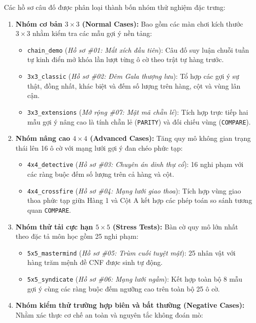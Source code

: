 Các hồ sơ câu đố được phân loại thành bốn nhóm thử nghiệm đặc trưng:
\begin{enumerate}
    \item \textbf{Nhóm cơ bản $3 \times 3$ (Normal Cases):} Bao gồm các màn chơi kích thước $3 \times 3$ nhằm kiểm tra các mẫu gợi ý nền tảng:
    \begin{itemize}
        \item \texttt{chain\_demo} (\textit{Hồ sơ \#01: Mắt xích đầu tiên}): Câu đố suy luận chuỗi tuần tự kinh điển mở khóa lần lượt từng ô cờ theo trật tự hàng trước.
        \item \texttt{3x3\_classic} (\textit{Hồ sơ \#02: Đêm Gala thượng lưu}): Tổ hợp các gợi ý sự thật, đồng nhất, khác biệt và đếm số lượng trên hàng, cột và vùng lân cận.
        \item \texttt{3x3\_extensions} (\textit{Mở rộng \#07: Mật mã chẵn lẻ}): Tích hợp trực tiếp hai mẫu gợi ý nâng cao là tính chẵn lẻ (\texttt{PARITY}) và đối chiếu vùng (\texttt{COMPARE}).
    \end{itemize}
    \item \textbf{Nhóm nâng cao $4 \times 4$ (Advanced Cases):} Tăng quy mô không gian trạng thái lên 16 ô cờ với mạng lưới gợi ý đan chéo phức tạp:
    \begin{itemize}
        \item \texttt{4x4\_detective} (\textit{Hồ sơ \#03: Chuyên án dinh thự cổ}): 16 nghi phạm với các ràng buộc đếm số lượng trên cả hàng và cột.
        \item \texttt{4x4\_crossfire} (\textit{Hồ sơ \#04: Mạng lưới giao thoa}): Tích hợp vùng giao thoa phức tạp giữa Hàng 1 và Cột A kết hợp các phép toán so sánh tương quan \texttt{COMPARE}.
    \end{itemize}
    \item \textbf{Nhóm thử tải cực hạn $5 \times 5$ (Stress Tests):} Bàn cờ quy mô lớn nhất theo đặc tả môn học gồm 25 nghi phạm:
    \begin{itemize}
        \item \texttt{5x5\_mastermind} (\textit{Hồ sơ \#05: Trùm cuối tuyệt mật}): 25 nhân vật với hàng trăm mệnh đề CNF được sinh tự động.
        \item \texttt{5x5\_syndicate} (\textit{Hồ sơ \#06: Mạng lưới ngầm}): Kết hợp toàn bộ 8 mẫu gợi ý cùng các ràng buộc đếm ngưỡng cao trên toàn bộ 25 ô cờ.
    \end{itemize}
    \item \textbf{Nhóm kiểm thử trường hợp biên và bất thường (Negative Cases):} Nhằm xác thực cơ chế an toàn và nguyên tắc không đoán mò:

\end{enumerate}
